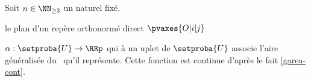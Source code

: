 %
%
%
%
%
%		
%    
%
%
%
%
%
%
%
%
%
%
%
%
%
%
%

\newpage %


\begin{fact} \label{garea-cont}
    Soit $n \in \NN_{\geq3}$ un naturel fixé.
   
   
   le plan d'un repère orthonormé direct $\pvaxes{O | i | j}$
   
   
    $\alpha: \setproba{U} \rightarrow \RRp$ qui à un uplet de $\setproba{U}$ associe l'aire généralisée du \ncycle\ qu'il représente.
        Cette fonction est continue d'après le fait \ref{garea-cont}.
\end{fact}


